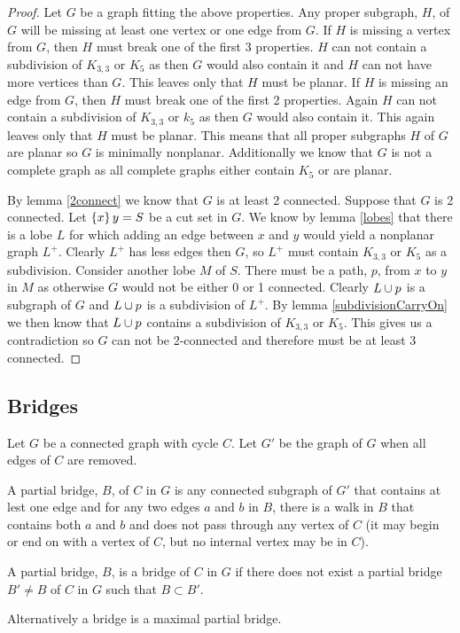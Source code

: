 \documentclass{article}
\begin{document}
\begin{proof}
	Let $G$ be a graph fitting the above properties. Any proper subgraph, $H$, of $G$ will be missing at least one vertex or one edge from $G$. If $H$ is missing a vertex from $G$, then $H$ must break one of the first 3 properties. $H$ can not contain a subdivision of $K_{3,3}$ or $K_5$ as then $G$ would also contain it and $H$ can not have more vertices than $G$. This leaves only that $H$ must be planar. If $H$ is missing an edge from $G$, then $H$ must break one of the first 2 properties. Again $H$ can not contain a subdivision of $K_{3,3}$ or $k_5$ as then $G$ would also contain it. This again leaves only that $H$ must be planar. This means that all proper subgraphs $H$ of $G$ are planar so $G$ is minimally nonplanar. Additionally we know that $G$ is not a complete graph as all complete graphs either contain $K_5$ or are planar.
	
	By lemma \ref{2connect} we know that $G$ is at least 2 connected. Suppose that $G$ is 2 connected. Let $\left\{ {x} \right\}y = S$ be a cut set in $G$. We know by lemma \ref{lobes} that there is a lobe $L$ for which adding an edge between $x$ and $y$ would yield a nonplanar graph $L^+$. Clearly $L^+$ has less edges then $G$, so $L^+$ must contain $K_{3,3}$ or $K_{5}$ as a subdivision. Consider another lobe $M$ of $S$. There must be a path, $p$, from $x$ to $y$ in $M$ as otherwise $G$ would not be either 0 or 1 connected. Clearly $L\cup p$ is a subgraph of $G$ and $L\cup p$ is a subdivision of $L^+$. By lemma \ref{subdivisionCarryOn} we then know that $L\cup p$ contains a subdivision of $K_{3,3}$ or $K_5$. This gives us a contradiction so $G$ can not be 2-connected and therefore must be at least 3 connected.
\end{proof}

\subsection{Bridges}

Let $G$ be a connected graph with cycle $C$. Let $G'$ be the graph of $G$ when all edges of $C$ are removed. 
\begin{definition}
	A partial bridge, $B$, of $C$ in $G$ is any connected subgraph of $G'$ that contains at lest one edge and for any two edges $a$ and $b$ in $B$, there is a walk in $B$ that contains both $a$ and $b$ and does not pass through any vertex of $C$ (it may begin or end on with a vertex of $C$, but no internal vertex may be in $C$). 
\end{definition}
\begin{definition}[bridge]
	A partial bridge, $B$, is a bridge of $C$ in $G$ if there does not exist a partial bridge $B'\not=B$ of $C$ in $G$ such that $B\subset B'$.
	
	Alternatively a bridge is a maximal partial bridge.
\end{definition}
\end{document}
